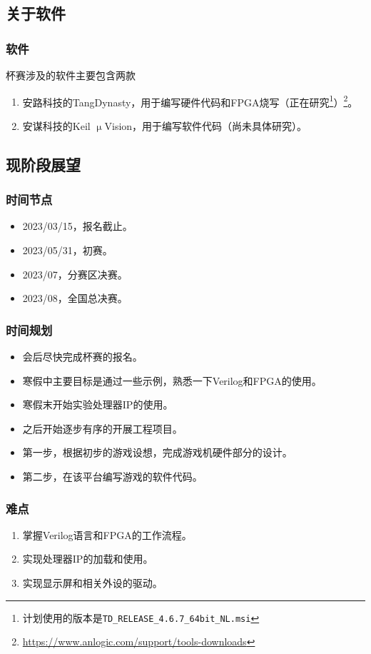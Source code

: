 \documentclass[compress,aspectratio=169]{ctexbeamer}
\begin{document}
\subsection{关于软件}
\begin{frame}
    \frametitle{软件}
    杯赛涉及的软件主要包含两款
    \begin{enumerate}
        \item 安路科技的TangDynasty，用于编写硬件代码和FPGA烧写（正在研究\footnote{计划使用的版本是\texttt{TD\_RELEASE\_4.6.7\_64bit\_NL.msi}}）\footnote{\url{https://www.anlogic.com/support/tools-downloads}}。
        \item 安谋科技的Keil $\upmu$Vision，用于编写软件代码（尚未具体研究）。
    \end{enumerate}
\end{frame}

\subsection{现阶段展望}
\begin{frame}
    \frametitle{时间节点}
    \begin{itemize}
        \item 2023/03/15，报名截止。
        \item 2023/05/31，初赛。
        \item 2023/07，分赛区决赛。
        \item 2023/08，全国总决赛。
    \end{itemize}
\end{frame}

\begin{frame}
    \frametitle{时间规划}
    \begin{itemize}
        \item 会后尽快完成杯赛的报名。
        \item 寒假中主要目标是通过一些示例，熟悉一下Verilog和FPGA的使用。
        \item 寒假末开始实验处理器IP的使用。
        \item 之后开始逐步有序的开展工程项目。
        \item 第一步，根据初步的游戏设想，完成游戏机硬件部分的设计。
        \item 第二步，在该平台编写游戏的软件代码。
    \end{itemize}
\end{frame}

\begin{frame}
    \frametitle{难点}
    \begin{enumerate}
        \item 掌握Verilog语言和FPGA的工作流程。
        \item 实现处理器IP的加载和使用。
        \item 实现显示屏和相关外设的驱动。
    \end{enumerate}
\end{frame}
\end{document}
